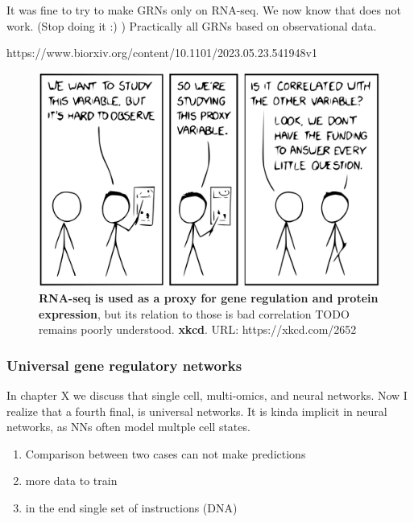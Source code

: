 It was fine to try to make GRNs only on RNA-seq. We now know that does not work. (Stop doing it :) )
Practically all GRNs based on observational data.

https://www.biorxiv.org/content/10.1101/2023.05.23.541948v1


\begin{figure}[H]
    \includegraphics[width=\linewidth]{ch.discussion/imgs/xkcd.png}
    \caption{\textbf{RNA-seq is used as a proxy for gene regulation and protein expression}, but its relation to those is bad correlation TODO remains poorly understood. \textbf{xkcd}. URL: https://xkcd.com/2652}
    \label{fig:xkcd}
\end{figure}

\subsubsection{Universal gene regulatory networks}

In chapter X we discuss that single cell, multi-omics, and neural networks. Now I realize that a fourth final, is universal networks. It is kinda implicit in neural networks, as NNs often model multple cell states.

\begin{enumerate}
    \item Comparison between two cases can not make predictions
    \item more data to train
    \item in the end single set of instructions (DNA)
\end{enumerate}

